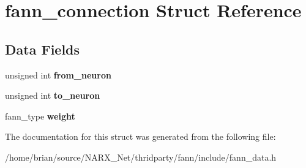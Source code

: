 \hypertarget{structfann__connection}{\section{fann\-\_\-connection Struct Reference}
\label{structfann__connection}
}
\subsection*{Data Fields}
\begin{DoxyCompactItemize}
\item 
\hypertarget{structfann__connection_ae0723d0ffe18b2d2377662e35ea224b4}{unsigned int {\bfseries from\-\_\-neuron}}\label{structfann__connection_ae0723d0ffe18b2d2377662e35ea224b4}

\item 
\hypertarget{structfann__connection_ae7ff6cab86250811520f8d9578906505}{unsigned int {\bfseries to\-\_\-neuron}}\label{structfann__connection_ae7ff6cab86250811520f8d9578906505}

\item 
\hypertarget{structfann__connection_acac54c29a31a41bfe43931a6fc257e8f}{fann\-\_\-type {\bfseries weight}}\label{structfann__connection_acac54c29a31a41bfe43931a6fc257e8f}

\end{DoxyCompactItemize}


The documentation for this struct was generated from the following file\-:\begin{DoxyCompactItemize}
\item 
/home/brian/source/\-N\-A\-R\-X\-\_\-\-Net/thridparty/fann/include/fann\-\_\-data.\-h\end{DoxyCompactItemize}
